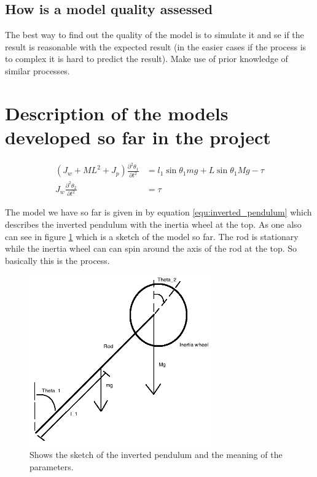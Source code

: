 \documentclass{article}
\begin{document}
\subsection{How is a model quality assessed}

The best way to find out the quality of the model is to simulate it and se if the result is reasonable with the expected result (in the easier cases if the process is to complex it is hard to predict the result). Make use of prior knowledge of similar processes.    


\section{Description of the models developed so far in the project }

\begin{equation}
		\begin{aligned}
	     	 (J_{w}+ML^2 + J_{p} ) \frac{\partial^2 \theta_{1} }{\partial t^2}  &= l_{1} \sin{\theta_{1}} m g + L \sin{\theta_{1}} M g - \tau    \\  
		 J_{w} \frac{\partial^2 \theta_{2}} {\partial t^2} &= \tau
		\end{aligned}
	 	\label{equ:inverted_pendulum}  
\end{equation}


The model we have so far is given in by equation \ref{equ:inverted_pendulum} which describes the inverted pendulum with the inertia wheel at the top. As one also can see in figure \ref{fig:sketch_inverted_pendulum} which is a sketch of the model so far. The rod is stationary while the inertia wheel can can spin around the axis of the rod at the top. So basically this is the process.

\begin{figure}
	\centering
	\includegraphics[width=0.7\textwidth]{Inverted_pedulum_2}
	\caption{Shows the sketch of the inverted pendulum and the meaning of the parameters.}
	\label{fig:sketch_inverted_pendulum}
\end{figure}
\end{document}
